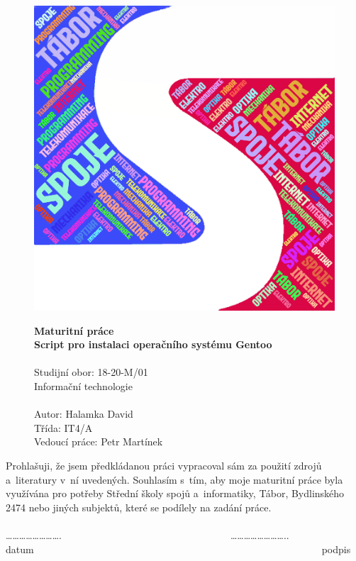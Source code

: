 \documentclass[12pt,a4paper,twoside,]{article}
\begin{document}
\begin{figure}[h!]
\centering
\includegraphics[scale=0.5,]{obrazky/sssi_logo.png}


	
\textsf{\textbf{\Huge Maturitní práce\\}}
\textsf{ \textbf{\Huge Script pro instalaci operačního systému Gentoo \\}}
\textsf{ \Huge \\Studijní obor: 18-20-M/01 \\Informační technologie\\}
\textsf{\LARGE \\Autor: Halamka David\\
Třída: IT4/A\\
Vedoucí práce: Petr Martínek
}
\thispagestyle{empty}
\end{figure}


\newpage
\thispagestyle{empty}
Prohlašuji, že jsem předkládanou práci vypracoval sám za použití zdrojů a~literatury v~ní uvedených. Souhlasím s~tím, aby moje maturitní práce byla využívána pro potřeby Střední školy spojů a~informatiky, Tábor, Bydlinského 2474 nebo jiných subjektů, které se podílely na zadání práce.\\ 
\\	…………………….~~~~~~~~~~~~~~~~~~~~~~~~~~~~~~~~~~……………………..\\
datum~~~~~~~~~~~~~~~~~~~~~~~~~~~~~~~~~~~~~~~~~~~~~~~~~~~~~~~~~~podpis
\end{document}
